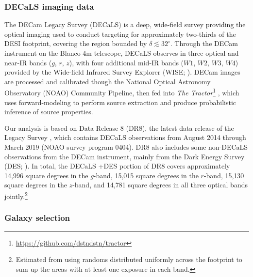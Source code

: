 \subsubsection{DECaLS imaging data}


The DECam Legacy Survey (DECaLS) is a deep, wide-field survey providing the optical imaging used to conduct targeting for approximately two-thirds of the DESI footprint, covering the region bounded by $\delta \lesssim 32^{\circ}$. Through the DECam instrument \citep{Flaugher15} on the Blanco 4m telescope, DECaLS observes in three optical and near-IR bands ($g$, $r$, $z$), with four additional mid-IR bands ($W1$, $W2$, $W3$, $W4$) provided by the Wide-field Infrared Survey Explorer (WISE; \citealt{Wright10}). DECam images are processed and calibrated though the National Optical Astronomy
Observatory (NOAO) Community Pipeline, then fed into \textit{The Tractor}\footnote{\url{https://github.com/dstndstn/tractor}} \citep{Lang16a}, which uses forward-modeling to perform source extraction and produce probabilistic inference of source properties.



Our analysis is based on Data Release 8 (DR8), the latest data release of the Legacy Survey \citep{Dey18}, which contains DECaLS observations from August 2014 through March 2019 (NOAO survey program 0404). DR8 also includes some non-DECaLS observations from the DECam instrument, mainly from the Dark Energy Survey (DES; \citealt{DES05}). In total, the DECaLS +DES portion of DR8 covers approximately 14,996 square degrees in the $g$-band, 15,015 square degrees in the $r$-band, 15,130 square degrees in the $z$-band, and 14,781 square degrees in all three optical bands jointly.\footnote{Estimated from using randoms distributed uniformly across the footprint to sum up the areas with at least one exposure in each band.} 

\subsubsection{Galaxy selection}\label{sec:data:ts}

